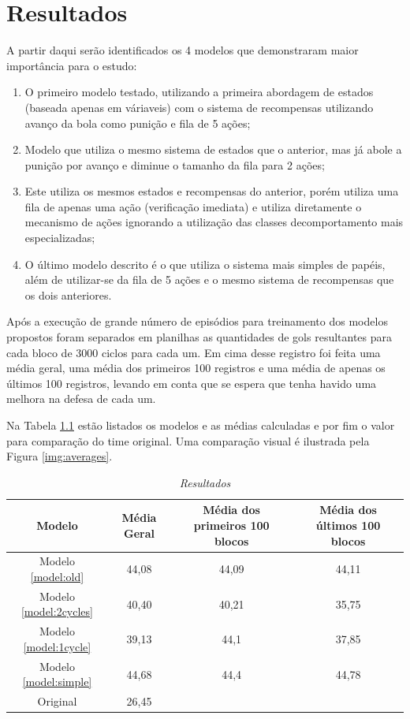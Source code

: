 \chapter{Resultados} \label{sec:results}

A partir daqui serão identificados os 4 modelos que demonstraram maior
importância para o estudo:

\begin{enumerate}
    \item\label{model:old} O primeiro modelo testado, utilizando a primeira abordagem de estados
    (baseada apenas em váriaveis) com o sistema de recompensas utilizando avanço
    da bola como punição e fila de 5 ações;
    \item\label{model:2cycles} Modelo que utiliza o mesmo sistema de estados que o anterior, mas já
    abole a punição por avanço e diminue o tamanho da fila para 2 ações;
    \item\label{model:1cycle} Este utiliza os mesmos estados e recompensas do anterior, porém
    utiliza uma fila de apenas uma ação (verificação imediata) e utiliza
    diretamente o mecanismo de ações ignorando a utilização das classes
    decomportamento mais especializadas;
    \item\label{model:simple} O último modelo descrito é o que utiliza o sistema mais simples de
    papéis, além de utilizar-se da fila de 5 ações e o mesmo sistema de
    recompensas que os dois anteriores.
\end{enumerate}

Após a execução de grande número de episódios para treinamento dos modelos
propostos foram separados em planilhas as quantidades de gols resultantes para
cada bloco de 3000 ciclos para cada um. Em cima desse registro foi feita uma
média geral, uma média dos primeiros 100 registros e uma média de apenas os
últimos 100 registros, levando em conta que se
espera que tenha havido uma melhora na defesa de cada um.

Na Tabela \ref{tab:results} estão listados os modelos e as médias calculadas e
por fim o valor para comparação do time original. Uma comparação visual é
ilustrada pela Figura \ref{img:averages}.

\begin{table}[hbt]
    \centering
    \begin{tabular}{c|c|c|c}
        Modelo & Média Geral & Média dos primeiros 100 blocos & Média dos últimos 100 blocos \\ \hline
        Modelo \ref{model:old} & 44,08 & 44,09 & 44,11  \\
        Modelo \ref{model:2cycles} & 40,40 & 40,21 & 35,75 \\
        Modelo \ref{model:1cycle} & 39,13 & 44,1 & 37,85 \\
        Modelo \ref{model:simple} & 44,68 & 44,4 & 44,78 \\ \hline
        Original &  26,45\\
    \end{tabular}
    \caption{\textit{Resultados}}
    \label{tab:results}
\end{table}

